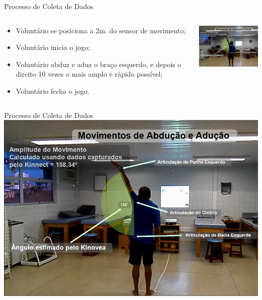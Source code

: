 \documentclass{beamer}
\begin{document}
\begin{frame}{Processo de Coleta de Dados}
   \begin{block}{}   
   \begin{columns}[c]
     \begin{column}{0.5\linewidth}
				\begin{itemize}[<+->]
					\item Voluntário se posiciona a 2m. do sensor de movimento;
					\item Voluntário inicia o jogo;
					\item Voluntário abduz e aduz o braço esquerdo, e depois o direito 10 vezes o mais amplo e rápido possível;
					\item Voluntário fecha o jogo.
				\end{itemize}
     \end{column}

     \begin{column}{0.55\linewidth}
				\includegraphics[width=5.5cm]{img/capturaducaokinnect.png}
    \end{column}
\end{columns}
\end{block}
\end{frame}
% 
% 
% 
\begin{frame}{Processo de Coleta de Dados}
      \center \includegraphics[height=2.6 in]{img/capturaducaokinnect.png}
\end{frame}
\end{document}
